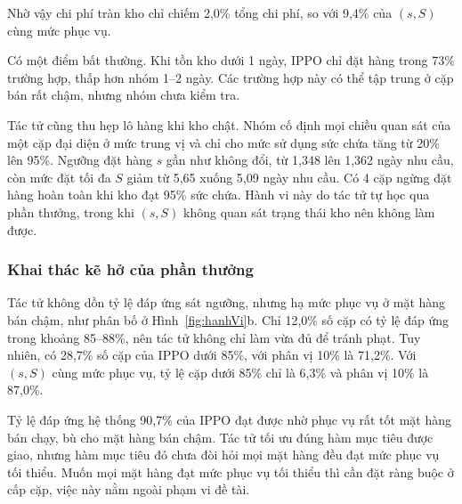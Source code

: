 Nhờ vậy chi phí tràn kho chỉ chiếm 2,0\% tổng chi phí, so với 9,4\% của $(s,S)$ cùng mức phục vụ.

Có một điểm bất thường. Khi tồn kho dưới 1 ngày, IPPO chỉ đặt hàng trong 73\% trường hợp, thấp hơn nhóm 1--2 ngày. Các trường hợp này có thể tập trung ở cặp bán rất chậm, nhưng nhóm chưa kiểm tra.

Tác tử cũng thu hẹp lô hàng khi kho chật. Nhóm cố định mọi chiều quan sát của một cặp đại diện ở mức trung vị và chỉ cho mức sử dụng sức chứa tăng từ 20\% lên 95\%. Ngưỡng đặt hàng $s$ gần như không đổi, từ 1,348 lên 1,362 ngày nhu cầu, còn mức đặt tối đa $S$ giảm từ 5,65 xuống 5,09 ngày nhu cầu. Có 4 cặp ngừng đặt hàng hoàn toàn khi kho đạt 95\% sức chứa. Hành vi này do tác tử tự học qua phần thưởng, trong khi $(s, S)$ không quan sát trạng thái kho nên không làm được.

\subsubsection{Khai thác kẽ hở của phần thưởng}

Tác tử không dồn tỷ lệ đáp ứng sát ngưỡng, nhưng hạ mức phục vụ ở mặt hàng bán chậm, như phân bố ở Hình~\ref{fig:hanhVi}b. Chỉ 12,0\% số cặp có tỷ lệ đáp ứng trong khoảng 85--88\%, nên tác tử không chỉ làm vừa đủ để tránh phạt. Tuy nhiên, có 28,7\% số cặp của IPPO dưới 85\%, với phân vị 10\% là 71,2\%. Với $(s,S)$ cùng mức phục vụ, tỷ lệ cặp dưới 85\% chỉ là 6,3\% và phân vị 10\% là 87,0\%.

Tỷ lệ đáp ứng hệ thống 90,7\% của IPPO đạt được nhờ phục vụ rất tốt mặt hàng bán chạy, bù cho mặt hàng bán chậm. Tác tử tối ưu đúng hàm mục tiêu được giao, nhưng hàm mục tiêu đó chưa đòi hỏi mọi mặt hàng đều đạt mức phục vụ tối thiểu. Muốn mọi mặt hàng đạt mức phục vụ tối thiểu thì cần đặt ràng buộc ở cấp cặp, việc này nằm ngoài phạm vi đề tài.

